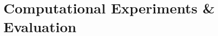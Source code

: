 \documentclass[draft,final]{vutinfth} %
\begin{document}



\chapter{Computational Experiments \& Evaluation}\label{chp:evaluation}
\end{document}
